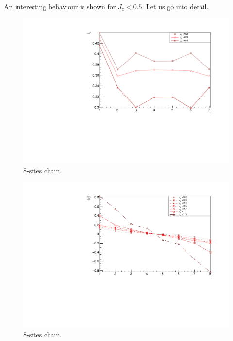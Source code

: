 An interesting behaviour is shown for $J_z < 0.5$. Let us go into detail.

\begin{figure}[H]
    \centering
    \includegraphics[scale=0.7]{Figures/8sites_spinCurrVsLOWJz.pdf}
    \caption{8-sites chain.}
    \label{fig:my_label}
\end{figure}

\begin{figure}[H]
    \centering
    \includegraphics[scale=0.7]{Figures/8sites_LMvsJz.pdf}
    \caption{8-sites chain.}
    \label{fig:my_label}
\end{figure}

